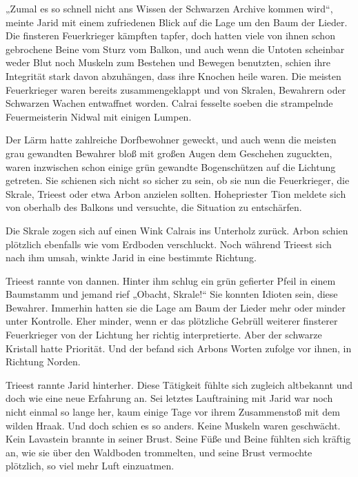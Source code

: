 „Zumal es so schnell nicht ans Wissen der Schwarzen Archive kommen wird“, meinte Jarid mit einem zufriedenen Blick auf die Lage um den Baum der Lieder. Die finsteren Feuerkrieger kämpften tapfer, doch hatten viele von ihnen schon gebrochene Beine vom Sturz vom Balkon, und auch wenn die Untoten scheinbar weder Blut noch Muskeln zum Bestehen und Bewegen benutzten, schien ihre Integrität stark davon abzuhängen, dass ihre Knochen heile waren. Die meisten Feuerkrieger waren bereits zusammengeklappt und von Skralen, Bewahrern oder Schwarzen Wachen entwaffnet worden. Calrai fesselte soeben die strampelnde Feuermeisterin Nidwal mit einigen Lumpen.

Der Lärm hatte zahlreiche Dorfbewohner geweckt, und auch wenn die meisten grau gewandten Bewahrer bloß mit großen Augen dem Geschehen zuguckten, waren inzwischen schon einige grün gewandte Bogenschützen auf die Lichtung getreten. Sie schienen sich nicht so sicher zu sein, ob sie nun die Feuerkrieger, die Skrale, Trieest oder etwa Arbon anzielen sollten. Hohepriester Tion meldete sich von oberhalb des Balkons und versuchte, die Situation zu entschärfen.

Die Skrale zogen sich auf einen Wink Calrais ins Unterholz zurück. Arbon schien plötzlich ebenfalls wie vom Erdboden verschluckt. Noch während Trieest sich nach ihm umsah, winkte Jarid in eine bestimmte Richtung.

Trieest rannte von dannen. Hinter ihm schlug ein grün gefierter Pfeil in einem Baumstamm und jemand rief „Obacht, Skrale!“ Sie konnten Idioten sein, diese Bewahrer. Immerhin hatten sie die Lage am Baum der Lieder mehr oder minder unter Kontrolle. Eher minder, wenn er das plötzliche Gebrüll weiterer finsterer Feuerkrieger von der Lichtung her richtig interpretierte. Aber der schwarze Kristall hatte Priorität. Und der befand sich Arbons Worten zufolge vor ihnen, in Richtung Norden.\bigskip







Trieest rannte Jarid hinterher. Diese Tätigkeit fühlte sich zugleich altbekannt und doch wie eine neue Erfahrung an. Sei letztes Lauftraining mit Jarid war noch nicht einmal so lange her, kaum einige Tage vor ihrem Zusammenstoß mit dem wilden Hraak. Und doch schien es so anders. Keine Muskeln waren geschwächt. Kein Lavastein brannte in seiner Brust. Seine Füße und Beine fühlten sich kräftig an, wie sie über den Waldboden trommelten, und seine Brust vermochte plötzlich, so viel mehr Luft einzuatmen.

